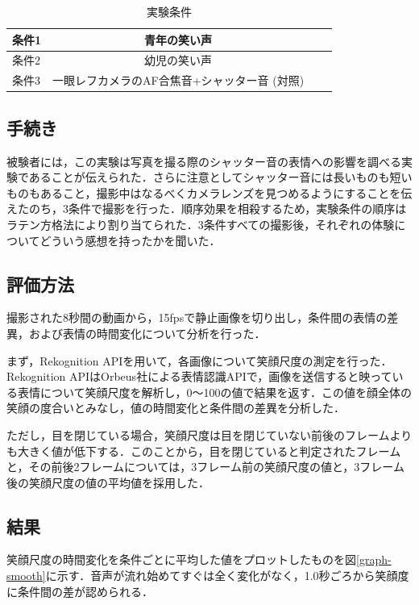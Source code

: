 \documentclass[submit,techreq]{ec2014}
\begin{document}
\begin{table}[htb]
  \begin{center}
    \caption{実験条件}
    \begin{tabular}{|l|c|r||r|} \hline
      条件1 & 青年の笑い声 \\ \hline 
      条件2 & 幼児の笑い声 \\ \hline
      条件3 & 一眼レフカメラのAF合焦音+シャッター音 (対照) \\ \hline
    \end{tabular}
    \label{tab:price}
  \end{center}
\end{table}

\subsection{手続き}

被験者には，この実験は写真を撮る際のシャッター音の表情への影響を調べる実験であることが伝えられた．さらに注意としてシャッター音には長いものも短いものもあること，撮影中はなるべくカメラレンズを見つめるようにすることを伝えたのち，3条件で撮影を行った．順序効果を相殺するため，実験条件の順序はラテン方格法により割り当てられた．3条件すべての撮影後，それぞれの体験についてどういう感想を持ったかを聞いた．

\subsection{評価方法}

撮影された8秒間の動画から，15fpsで静止画像を切り出し，条件間の表情の差異，および表情の時間変化について分析を行った．

まず，Rekognition APIを用いて，各画像について笑顔尺度の測定を行った．Rekognition APIはOrbeus社による表情認識APIで，画像を送信すると映っている表情について笑顔尺度を解析し，0〜100の値で結果を返す．この値を顔全体の笑顔の度合いとみなし，値の時間変化と条件間の差異を分析した．

ただし，目を閉じている場合，笑顔尺度は目を閉じていない前後のフレームよりも大きく値が低下する．このことから，目を閉じていると判定されたフレームと，その前後2フレームについては，3フレーム前の笑顔尺度の値と，3フレーム後の笑顔尺度の値の平均値を採用した．

\subsection{結果}

笑顔尺度の時間変化を条件ごとに平均した値をプロットしたものを図\ref{graph-smooth}に示す．音声が流れ始めてすぐは全く変化がなく，1.0秒ごろから笑顔度に条件間の差が認められる．
\end{document}
